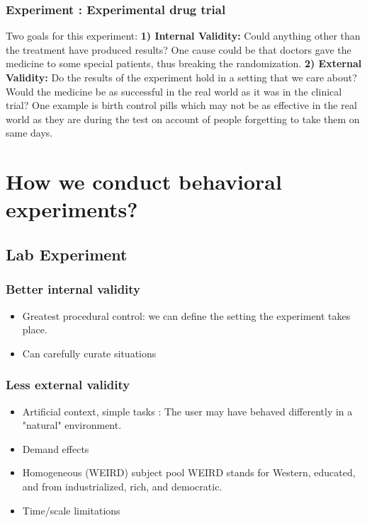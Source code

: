 \documentclass[a4paper]{article}
\begin{document}
\subsubsection{Experiment : Experimental drug trial}
Two goals for this experiment:\newline
\textbf{1) Internal Validity:}
Could anything other than the treatment have produced results?\newline
One cause could be that doctors gave the medicine to some special patients, thus breaking the randomization. \newline
\textbf{2) External Validity:}
Do the results of the experiment hold in a setting that we care about? \newline
Would the medicine be as successful in the real world as it was in the clinical trial? \newline
One example is birth control pills which may not be as effective in the real world as they are during the test on account of people forgetting to take them on same days.

\section{How we conduct behavioral experiments?}
\subsection{Lab Experiment}
\subsubsection{Better internal validity}
\begin{itemize}
\item Greatest procedural control: we can define the setting the experiment takes place.
\item Can carefully curate situations
\end{itemize}

\subsubsection{Less external validity}
\begin{itemize}
\item Artificial context, simple tasks : \newline
The user may have behaved differently in a "natural" environment.
\item Demand effects 
\item Homogeneous (WEIRD) subject pool \newline
WEIRD stands for Western, educated, and from industrialized, rich, and democratic.
\item Time/scale limitations
\end{itemize}
\end{document}
